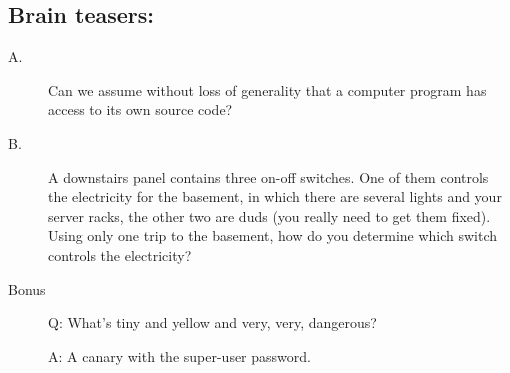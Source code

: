 \documentclass{article}
\begin{document}
\subsection*{Brain teasers:}
\begin{description}
\item[A.] Can we assume without loss of generality that a computer program has access to its own source code? 

\item[B.] A downstairs panel contains three on-off switches. One of them controls the electricity for the basement, in which there are several lights and your server racks, the other two are duds (you really need to get them fixed). Using only one trip to the basement, how do you determine which switch controls the electricity? 


\item[Bonus] Q: What's tiny and yellow and very, very, dangerous?

A: A canary with the super-user password.

\end{description}
\end{document}
